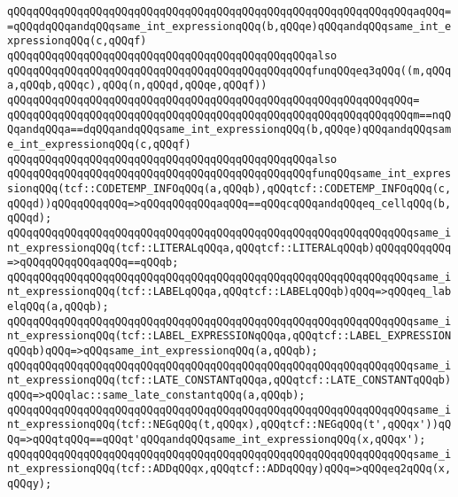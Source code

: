 \verb|qQQqqQQqqQQqqQQqqQQqqQQqqQQqqQQqqQQqqQQqqQQqqQQqqQQqqQQqqQQqqQQqaqQQq==qQQqdqQQqandqQQqsame_int_expressionqQQq(b,qQQqe)qQQqandqQQqsame_int_expressionqQQq(c,qQQqf)|\newline
\newline
\verb|qQQqqQQqqQQqqQQqqQQqqQQqqQQqqQQqqQQqqQQqqQQqqQQqalso|\newline
\verb|qQQqqQQqqQQqqQQqqQQqqQQqqQQqqQQqqQQqqQQqqQQqqQQqfunqQQqeq3qQQq((m,qQQqa,qQQqb,qQQqc),qQQq(n,qQQqd,qQQqe,qQQqf))|\newline
\verb|qQQqqQQqqQQqqQQqqQQqqQQqqQQqqQQqqQQqqQQqqQQqqQQqqQQqqQQqqQQqqQQq=|\newline
\verb|qQQqqQQqqQQqqQQqqQQqqQQqqQQqqQQqqQQqqQQqqQQqqQQqqQQqqQQqqQQqqQQqm==nqQQqandqQQqa==dqQQqandqQQqsame_int_expressionqQQq(b,qQQqe)qQQqandqQQqsame_int_expressionqQQq(c,qQQqf)|\newline
\newline
\verb|qQQqqQQqqQQqqQQqqQQqqQQqqQQqqQQqqQQqqQQqqQQqqQQqalso|\newline
\verb|qQQqqQQqqQQqqQQqqQQqqQQqqQQqqQQqqQQqqQQqqQQqqQQqfunqQQqsame_int_expressionqQQq(tcf::CODETEMP_INFOqQQq(a,qQQqb),qQQqtcf::CODETEMP_INFOqQQq(c,qQQqd))qQQqqQQqqQQq=>qQQqqQQqqQQqaqQQq==qQQqcqQQqandqQQqeq_cellqQQq(b,qQQqd);|\newline
\verb|qQQqqQQqqQQqqQQqqQQqqQQqqQQqqQQqqQQqqQQqqQQqqQQqqQQqqQQqqQQqqQQqsame_int_expressionqQQq(tcf::LITERALqQQqa,qQQqtcf::LITERALqQQqb)qQQqqQQqqQQq=>qQQqqQQqqQQqaqQQq==qQQqb;|\newline
\verb|qQQqqQQqqQQqqQQqqQQqqQQqqQQqqQQqqQQqqQQqqQQqqQQqqQQqqQQqqQQqqQQqsame_int_expressionqQQq(tcf::LABELqQQqa,qQQqtcf::LABELqQQqb)qQQq=>qQQqeq_labelqQQq(a,qQQqb);|\newline
\verb|qQQqqQQqqQQqqQQqqQQqqQQqqQQqqQQqqQQqqQQqqQQqqQQqqQQqqQQqqQQqqQQqsame_int_expressionqQQq(tcf::LABEL_EXPRESSIONqQQqa,qQQqtcf::LABEL_EXPRESSIONqQQqb)qQQq=>qQQqsame_int_expressionqQQq(a,qQQqb);|\newline
\verb|qQQqqQQqqQQqqQQqqQQqqQQqqQQqqQQqqQQqqQQqqQQqqQQqqQQqqQQqqQQqqQQqsame_int_expressionqQQq(tcf::LATE_CONSTANTqQQqa,qQQqtcf::LATE_CONSTANTqQQqb)qQQq=>qQQqlac::same_late_constantqQQq(a,qQQqb);|\newline
\verb|qQQqqQQqqQQqqQQqqQQqqQQqqQQqqQQqqQQqqQQqqQQqqQQqqQQqqQQqqQQqqQQqsame_int_expressionqQQq(tcf::NEGqQQq(t,qQQqx),qQQqtcf::NEGqQQq(t',qQQqx'))qQQq=>qQQqtqQQq==qQQqt'qQQqandqQQqsame_int_expressionqQQq(x,qQQqx');|\newline
\verb|qQQqqQQqqQQqqQQqqQQqqQQqqQQqqQQqqQQqqQQqqQQqqQQqqQQqqQQqqQQqqQQqsame_int_expressionqQQq(tcf::ADDqQQqx,qQQqtcf::ADDqQQqy)qQQq=>qQQqeq2qQQq(x,qQQqy);|\newline
